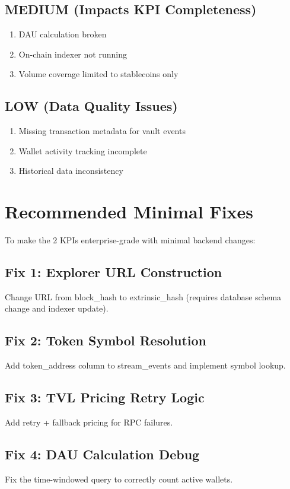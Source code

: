 \documentclass[11pt,a4paper]{article}
\begin{document}
\subsection{MEDIUM (Impacts KPI Completeness)}
\begin{enumerate}
    \item DAU calculation broken
    \item On-chain indexer not running
    \item Volume coverage limited to stablecoins only
\end{enumerate}

\subsection{LOW (Data Quality Issues)}
\begin{enumerate}
    \item Missing transaction metadata for vault events
    \item Wallet activity tracking incomplete
    \item Historical data inconsistency
\end{enumerate}

\section{Recommended Minimal Fixes}

To make the 2 KPIs enterprise-grade with minimal backend changes:

\subsection{Fix 1: Explorer URL Construction}
Change URL from block\_hash to extrinsic\_hash (requires database schema change and indexer update).

\subsection{Fix 2: Token Symbol Resolution}
Add token\_address column to stream\_events and implement symbol lookup.

\subsection{Fix 3: TVL Pricing Retry Logic}
Add retry + fallback pricing for RPC failures.

\subsection{Fix 4: DAU Calculation Debug}
Fix the time-windowed query to correctly count active wallets.
\end{document}
